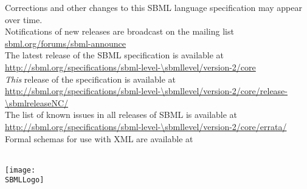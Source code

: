 \vfill

\begin{center}\sffamily
Corrections and other changes to this SBML language specification may appear over time.\\
Notifications of new releases are broadcast on the mailing list \href{http://www.sbml.org/Forums/sbml-announce}{sbml.org/forums/sbml-announce}\\[10pt]

The latest release of the SBML \thisLV specification is available at\\
\url{http://sbml.org/specifications/sbml-level-\sbmllevel/version-2/core}\\[10pt]

\emph{This} release of the specification is available at\\
\url{http://sbml.org/specifications/sbml-level-\sbmllevel/version-2/core/release-\sbmlreleaseNC/}\\[10pt]

The list of known issues in all releases of SBML \thisLV is available at\\
\url{http://sbml.org/specifications/sbml-level-\sbmllevel/version-2/core/errata/}\\[10pt]

Formal schemas for use with XML are available at\\
\sbmlSchemasURL\\[10pt]
\end{center}

\vfill

\centerline{\texttt{[image: \\SBMLLogo]}}
